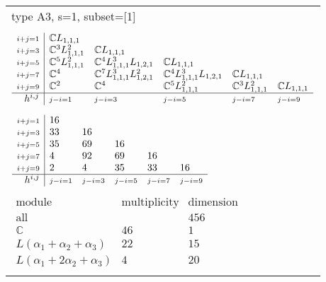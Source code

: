 \documentclass[crop,border=2mm]{standalone}
\begin{document}
\begin{tabular}{l}
{\huge type A3, s=1, subset=[1]}\\ \\


$\displaystyle
\begin{array}{r|l l l l l}
	{\scriptstyle i+j=1}&\mathbb{C}L_{1,1,1}&&&&\\
	{\scriptstyle i+j=3}&\mathbb{C}^{3}L_{1,1,1}^{2}&\mathbb{C}L_{1,1,1}&&&\\
	{\scriptstyle i+j=5}&\mathbb{C}^{5}L_{1,1,1}^{2}&\mathbb{C}^{4}L_{1,1,1}^{3}L_{1,2,1}&\mathbb{C}L_{1,1,1}&&\\
	{\scriptstyle i+j=7}&\mathbb{C}^{4}&\mathbb{C}^{7}L_{1,1,1}^{3}L_{1,2,1}^{2}&\mathbb{C}^{4}L_{1,1,1}^{3}L_{1,2,1}&\mathbb{C}L_{1,1,1}&\\
	{\scriptstyle i+j=9}&\mathbb{C}^{2}&\mathbb{C}^{4}&\mathbb{C}^{5}L_{1,1,1}^{2}&\mathbb{C}^{3}L_{1,1,1}^{2}&\mathbb{C}L_{1,1,1}\\
	\hline h^{i,j}&{\scriptstyle j-i=1}&{\scriptstyle j-i=3}&{\scriptstyle j-i=5}&{\scriptstyle j-i=7}&{\scriptstyle j-i=9}
\end{array}
$ \\ \\


$\displaystyle
\begin{array}{r|l l l l l}
	{\scriptstyle i+j=1}&16&&&&\\
	{\scriptstyle i+j=3}&33&16&&&\\
	{\scriptstyle i+j=5}&35&69&16&&\\
	{\scriptstyle i+j=7}&4&92&69&16&\\
	{\scriptstyle i+j=9}&2&4&35&33&16\\
	\hline h^{i,j}&{\scriptstyle j-i=1}&{\scriptstyle j-i=3}&{\scriptstyle j-i=5}&{\scriptstyle j-i=7}&{\scriptstyle j-i=9}
\end{array}
$ \\ \\


$\displaystyle
\begin{array}{rll}
	\text{module}&\text{multiplicity}&\text{dimension} \\ \hline \text{all}&&456 \\
	\mathbb{C}&46&1\\
	L\left(\alpha_{1}+\alpha_{2}+\alpha_{3}\right)&22&15\\
	L\left(\alpha_{1}+ 2\alpha_{2}+\alpha_{3}\right)&4&20
\end{array}
$ \\ \\

\end{tabular}
\end{document}
